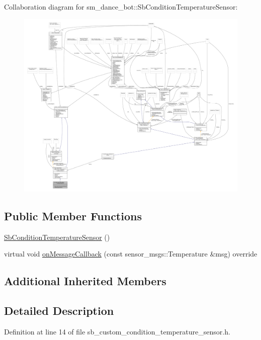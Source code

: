 Collaboration diagram for sm\+\_\+dance\+\_\+bot\+:\+:Sb\+Condition\+Temperature\+Sensor\+:
\nopagebreak
\begin{figure}[H]
\begin{center}
\leavevmode
\includegraphics[width=350pt]{classsm__dance__bot_1_1SbConditionTemperatureSensor__coll__graph}
\end{center}
\end{figure}
\subsection*{Public Member Functions}
\begin{DoxyCompactItemize}
\item 
\hyperlink{classsm__dance__bot_1_1SbConditionTemperatureSensor_a043907155d52652b774db96228150a18}{Sb\+Condition\+Temperature\+Sensor} ()
\item 
virtual void \hyperlink{classsm__dance__bot_1_1SbConditionTemperatureSensor_a0c846902177cb808d008ebc409c237f2}{on\+Message\+Callback} (const sensor\+\_\+msgs\+::\+Temperature \&msg) override
\end{DoxyCompactItemize}
\subsection*{Additional Inherited Members}


\subsection{Detailed Description}


Definition at line 14 of file sb\+\_\+custom\+\_\+condition\+\_\+temperature\+\_\+sensor.\+h.



